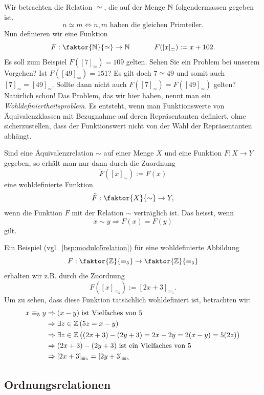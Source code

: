    \begin{rk}[Wohldefiniertheitsproblem]
    Wir betrachten die Relation $\simeq$, die auf der Menge $\mathbb{N}$ folgendermassen gegeben ist.
    \[
    n\simeq m\Leftrightarrow n,m\text{ haben die gleichen Primteiler}.
    \]
    Nun definieren wir eine Funktion
    \[
    F:\faktor{\N}{\simeq}\to \N\phantom{abstand}F([x]_\simeq):=x+102.
    \]
    Es soll zum Beispiel $F([7]_\simeq)=109$ gelten. Sehen Sie ein Problem bei unserem Vorgehen? Ist $F([49]_\simeq)=151$? Es gilt doch $7\simeq 49$ und somit auch $[7]_\simeq=[49]_\simeq$. Sollte dann nicht auch $F([7]_\simeq)=F([49]_\simeq)$ gelten? Natürlich schon! Das Problem, das wir hier haben, nennt man ein \textit{Wohldefiniertheitsproblem}. Es entsteht, wenn man Funktionswerte von Äquivalenzklassen mit Bezugnahme auf deren Repräsentanten definiert, ohne sicherzustellen, dass der Funktionswert nicht von der Wahl der Repräsentanten abhängt.

    Sind eine Äquivalenzrelation $\sim$ auf einer Menge $X$ und eine Funktion $F:X\to Y$ gegeben, so erhält man nur dann durch die Zuordnung
    \[
    \tilde F([x]_\sim):=F(x)
    \]
    eine wohldefinierte Funktion
    \[
    \tilde F:\faktor{X}{\sim}\to Y,
    \]
    wenn die Funktion $F$ mit der Relation $\sim$ verträglich ist. Das heisst, wenn
    \[
    x\sim y\Rightarrow F(x)=F(y)
    \]
    gilt.
    \end{rk}

    \begin{bsp}
    Ein Beispiel (vgl.~\ref{bsp:modulo5relation}) für eine wohldefinierte Abbildung
    \[
    F:\faktor{\Z}{\equiv_5}\to\faktor{\Z}{\equiv_5}
    \]
    erhalten wir z.B. durch die Zuordnung
    \[
    F([x]_{\equiv_5}):=[2x+3]_{\equiv_5}.
    \]
    Um zu sehen, dass diese Funktion tatsächlich wohldefiniert ist, betrachten wir:
    \begin{align*}
    x\equiv_5 y&\Rightarrow (x-y)\text{ ist Vielfaches von } 5\\
    &\Rightarrow\exists z\in\mathbb{Z}\,(5z=x-y)\\
    &\Rightarrow \exists z\in\mathbb{Z}\,\big((2x+3)-(2y+3)=2x-2y=2(x-y)=5(2z)\big)\\
    &\Rightarrow (2x+3)-(2y+3)\text{ ist ein Vielfaches von }5\\
    &\Rightarrow [2x+3]_{\equiv_5}=[2y+3]_{\equiv_5}\\
    \end{align*}
    \end{bsp}


    \subsection*{Ordnungsrelationen}

